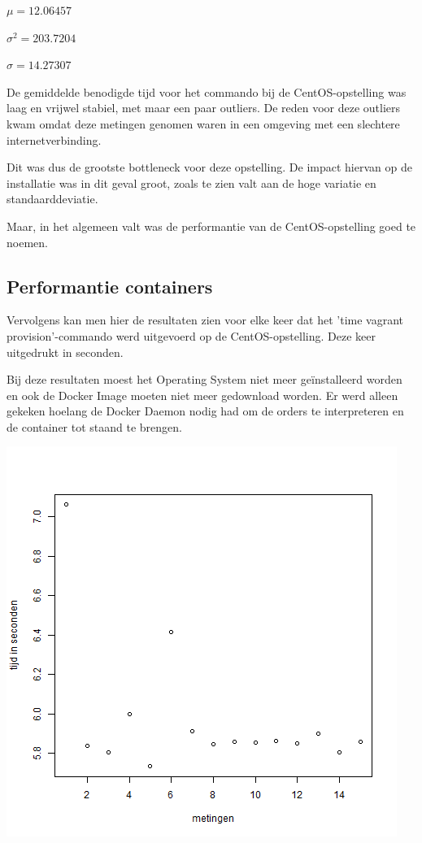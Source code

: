 $\mu = 12.06457$

$\sigma^2 = 203.7204$

$\sigma = 14.27307$

De gemiddelde benodigde tijd voor het commando bij de CentOS-opstelling was laag en vrijwel stabiel, met maar een paar outliers. De reden voor deze outliers kwam omdat deze metingen genomen waren in een omgeving met een slechtere internetverbinding.

Dit was dus de grootste bottleneck voor deze opstelling. De impact hiervan op de installatie was in dit geval groot, zoals te zien valt aan de hoge variatie en standaarddeviatie.

Maar, in het algemeen valt was de performantie van de CentOS-opstelling goed te noemen.

\subsection{Performantie containers}
Vervolgens kan men hier de resultaten zien voor elke keer dat het 'time vagrant provision'-commando werd uitgevoerd op de CentOS-opstelling. Deze keer uitgedrukt in seconden.

Bij deze resultaten moest het Operating System niet meer geïnstalleerd worden en ook de Docker Image moeten niet meer gedownload worden. Er werd alleen gekeken hoelang de Docker Daemon nodig had om de orders te interpreteren en de container tot staand te brengen.

\begin{center}
	\includegraphics[scale=0.5]{img/centosplotprovision.png}
\end{center}

